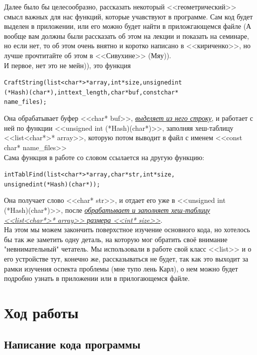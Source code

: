 \documentclass[a4paper,12pt]{article} %
\begin{document}
Далее было бы целесообразно, рассказать некоторый <<геометрический>> смысл важных для нас функций, которые учавствуют в программе. Сам код будет выделен в приложении, или его можно будет найти в приложгающемся файле (А вообще вам должны были рассказать об этом на лекции и показать на семинаре, но если нет, то об этом очень внятно и коротко написано в <<кириченко>>, но лучше прочтитайте об этом в <<Сивухине>> (Мяу)).\\

И первое, нет это не мейн)), это функция 
\begin{alltt}
CraftString (list<char*>* array, int* size, unsigned int\\ (*Hash)(char*), int text_length, char* buf, const char*\\ name_files);
\end{alltt}
Она обрабатывает буфер <<char* buf>>, \underline{\textit{выделяет из него строку}}, и работает с ней по функции <<unsigned int (*Hash)(char*)>>, заполняя хеш-таблицу <<list<char*>* array>>, которую потом выводит в файл с именем <<const char* name\_files>>\\

Сама функция в работе со словом ссылается на другую функцию:
\begin{alltt}
int TablFind (list<char*>* array, char* str, int* size,\\ unsigned int (*Hash)(char*));
\end{alltt}
Она получает слово <<char* str>>, и отдает его уже в <<unsigned int\\ (*Hash)(char*)>>, после \underline{\textit{обрабатывает и заполняет хеш-таблицу}}\\\underline{\textit{<<list<char*>* array>> размера <<int* size>>}}.\\

На этом мы можем закончить поверхстное изучение основного кода, но хотелось бы так же заметить одну деталь, на которую мог обратить своё внимание "невнимательный" четатель. Мы использовали в работе свой класс <<list>> и о его устройстве тут, конечно же, рассказываться не будет, так как это выходит за рамки изучения оспекта проблемы (мне тупо лень Карл), о нем можно будет подробно узнать в приложении или в прилогающемся файле.
\section{Ход работы}

\subsection{Написание кода программы}
\end{document}
